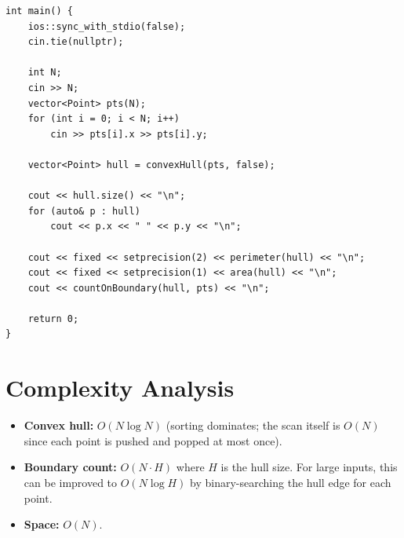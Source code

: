 \documentclass[11pt,a4paper]{article}
\begin{document}
\begin{lstlisting}
int main() {
    ios::sync_with_stdio(false);
    cin.tie(nullptr);

    int N;
    cin >> N;
    vector<Point> pts(N);
    for (int i = 0; i < N; i++)
        cin >> pts[i].x >> pts[i].y;

    vector<Point> hull = convexHull(pts, false);

    cout << hull.size() << "\n";
    for (auto& p : hull)
        cout << p.x << " " << p.y << "\n";

    cout << fixed << setprecision(2) << perimeter(hull) << "\n";
    cout << fixed << setprecision(1) << area(hull) << "\n";
    cout << countOnBoundary(hull, pts) << "\n";

    return 0;
}
\end{lstlisting}

\section{Complexity Analysis}
\begin{itemize}
  \item \textbf{Convex hull:} $O(N \log N)$ (sorting dominates; the
        scan itself is $O(N)$ since each point is pushed and popped at
        most once).
  \item \textbf{Boundary count:} $O(N \cdot H)$ where $H$ is the hull
        size. For large inputs, this can be improved to $O(N \log H)$
        by binary-searching the hull edge for each point.
  \item \textbf{Space:} $O(N)$.
\end{itemize}
\end{document}
